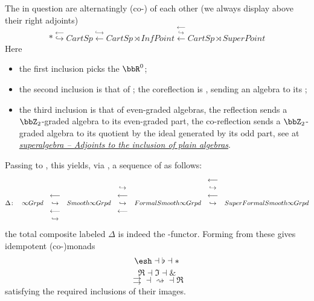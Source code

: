 \begin{lemma}
\label{SequenceOfSites}\hypertarget{SequenceOfSites}{}
The  in question are alternatingly (co-) of each other (we always display  above their right adjoints)
\begin{displaymath}
\ast
\stackrel{\longleftarrow}{\hookrightarrow}
CartSp
\stackrel{\hookrightarrow}{\longleftarrow}
CartSp\rtimes InfPoint
\stackrel{\longleftarrow}{\stackrel{\hookrightarrow}{\longleftarrow}}
CartSp \rtimes SuperPoint
\end{displaymath}
Here
\begin{itemize}%
\item the first inclusion picks the  $\bbR^0$;
\item the second inclusion is that of ; the coreflection is , sending an algebra to its ;
\item the third inclusion is that of even-graded algebras, the reflection sends a $\bbZ_2$-graded algebra to its even-graded part, the co-reflection sends a $\bbZ_2$-graded algebra to its quotient by the ideal generated by its odd part, see at \emph{\href{super+algebra#AdjointsToInclusionOfPlainAlgebra}{superalgebra -- Adjoints to the inclusion of plain algebras}}.
\end{itemize}
Passing to , this yields, via , a sequence of  as follows:
\begin{displaymath}
\begin{matrix}
& && && &\longleftarrow&
\\
& && &\hookrightarrow& &\hookrightarrow&
\\
& &\longleftarrow& &\longleftarrow& &\longleftarrow&
\\
\Delta \colon
&
\infty Grpd
&\hookrightarrow&
Smooth \infty Grpd
&\hookrightarrow&
FormalSmooth \infty Grpd
&\hookrightarrow&
SuperFormalSmooth \infty Grpd
\\
& &\longleftarrow& &\longleftarrow&
\\
& &\hookrightarrow&
\end{matrix}
\end{displaymath}
the total composite labeled $\Delta$ is indeed the -functor.
Forming  from these  gives idempotent (co-)monads
\begin{displaymath}
\esh  \dashv \flat \dashv \ast
\end{displaymath}
\begin{displaymath}
\Re \dashv \Im \dashv \&
\end{displaymath}
\begin{displaymath}
\rightrightarrows \dashv \rightsquigarrow \dashv \Re
\end{displaymath}
satisfying the required inclusions of their images.
\end{lemma}
